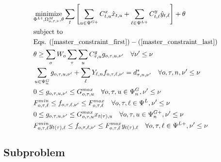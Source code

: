 \begin{align}
&\label{master_obj} \underset{\Phi^{L1}, \Omega_{o, \tau, \nu}^{M}, \theta}{\text{minimize}} \sum\limits_{t} \left[ \sum\limits_{u \in \Psi^{G+}} C^x_{t, u} \hat{x}_{t, u} + \sum\limits_{\ell \in \Psi^{L+}} C^y_{t, \ell} \hat{y}_{t, \ell} \right] + \theta \\
&\text{subject to} \nonumber \\
&\text{Eqs. } (\ref{master_constraint_first}) - (\ref{master_constraint_last}) \\
&\theta \geq \sum\limits_o W_o \sum\limits_{\tau} \sum\limits_{u} C_{\tau, u}^g g_{o, \tau, u, \nu'} \quad \forall \nu' \leq \nu \\
&\sum\limits_{u \in \Psi^G_{n}} g_{o, \tau, u, \nu'} + \sum\limits_{\ell} Y_{\ell, n} f_{o, \tau, \ell, \nu'} = d_{\tau, n, \nu'}^* \quad \forall o, \tau, n, \nu' \leq \nu \\
&0 \leq g_{o, \tau, u, \nu'} \leq G_{o, \tau, u}^{max} \quad \forall o, \tau, u \in \Psi_n^G, \nu' \leq \nu \\
&F_{o, \tau, \ell}^{min} \leq f_{o, \tau, \ell, \nu'} \leq F_{o, \tau, \ell}^{max} \quad \forall o, \tau, \ell \in \Psi^L, \nu' \leq \nu \\
&0 \leq g_{o, \tau, u, \nu'} \leq G_{o, \tau, u}^{max} x_{t(\tau), u} \quad \forall o, \tau, u \in \Psi_n^{G+}, \nu' \leq \nu \\
&F_{o, \tau, \ell}^{min} y_{t(\tau), \ell} \leq f_{o, \tau, \ell, \nu'} \leq F_{o, \tau, \ell}^{max} y_{t(\tau), \ell} \quad \forall o, \tau, \ell \in \Psi^{L+}, \nu' \leq \nu
\end{align}

\subsection{Subproblem}

